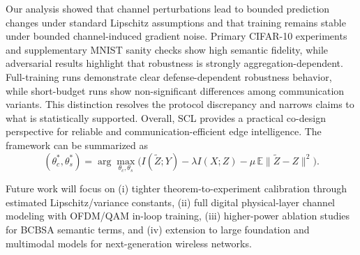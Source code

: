\documentclass[10pt,journal]{IEEEtran}
\begin{document}
Our analysis showed that channel perturbations lead to bounded prediction changes under standard Lipschitz assumptions and that training remains stable under bounded channel-induced gradient noise. Primary CIFAR-10 experiments and supplementary MNIST sanity checks show high semantic fidelity, while adversarial results highlight that robustness is strongly aggregation-dependent. Full-training runs demonstrate clear defense-dependent robustness behavior, while short-budget runs show non-significant differences among communication variants. This distinction resolves the protocol discrepancy and narrows claims to what is statistically supported. Overall, SCL provides a practical co-design perspective for reliable and communication-efficient edge intelligence. The framework can be summarized as
\begin{equation}
(\theta_c^*,\theta_s^*)=\arg\max_{\theta_c,\theta_s}\Big(I(\tilde{Z};Y)-\lambda I(X;Z)-\mu\,\mathbb{E}\|\tilde{Z}-Z\|^2\Big).
\end{equation}

Future work will focus on (i) tighter theorem-to-experiment calibration through estimated Lipschitz/variance constants, (ii) full digital physical-layer channel modeling with OFDM/QAM in-loop training, (iii) higher-power ablation studies for BCBSA semantic terms, and (iv) extension to large foundation and multimodal models for next-generation wireless networks.






\end{document}
